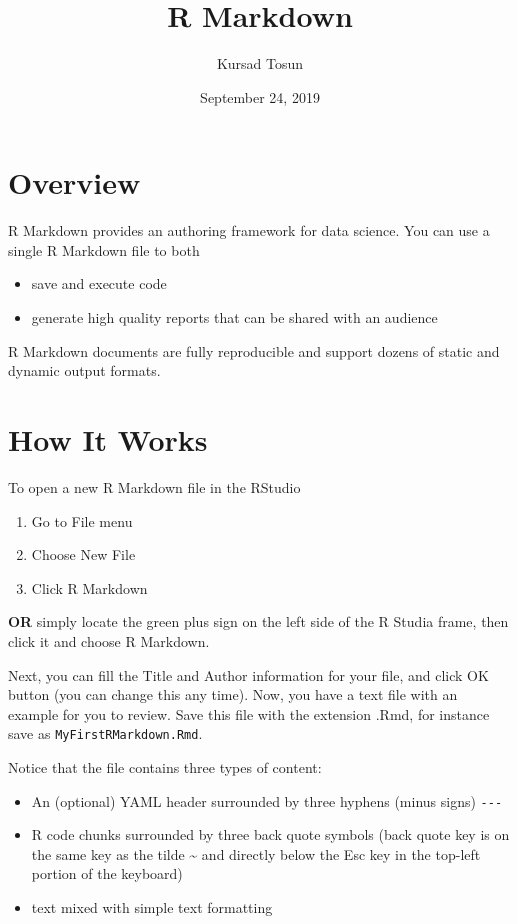 \documentclass[]{article}
\title{R Markdown}
\author{Kursad Tosun}
\date{September 24, 2019}
\providecommand{\tightlist}{%
  \setlength{\itemsep}{0pt}\setlength{\parskip}{0pt}}
\begin{document}
\maketitle

\hypertarget{overview}{%
\section{Overview}\label{overview}}

R Markdown provides an authoring framework for data science. You can use
a single R Markdown file to both

\begin{itemize}
\tightlist
\item
  save and execute code
\item
  generate high quality reports that can be shared with an audience
\end{itemize}

R Markdown documents are fully reproducible and support dozens of static
and dynamic output formats.

\hypertarget{how-it-works}{%
\section{How It Works}\label{how-it-works}}

To open a new R Markdown file in the RStudio

\begin{enumerate}
\def\labelenumi{\arabic{enumi}.}
\tightlist
\item
  Go to File menu
\item
  Choose New File
\item
  Click R Markdown
\end{enumerate}

\textbf{OR} simply locate the green plus sign on the left side of the R
Studia frame, then click it and choose R Markdown.

Next, you can fill the Title and Author information for your file, and
click OK button (you can change this any time). Now, you have a text
file with an example for you to review. Save this file with the
extension .Rmd, for instance save as \texttt{MyFirstRMarkdown.Rmd}.

Notice that the file contains three types of content:

\begin{itemize}
\tightlist
\item
  An (optional) YAML header surrounded by three hyphens (minus signs)
  \texttt{-\/-\/-}
\item
  R code chunks surrounded by three back quote symbols
  \texttt{\textasciigrave{}\textasciigrave{}\textasciigrave{}} (back
  quote key is on the same key as the tilde \textasciitilde{} and
  directly below the Esc key in the top-left portion of the keyboard)
\item
  text mixed with simple text formatting
\end{itemize}
\end{document}
